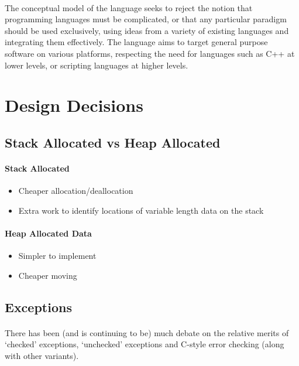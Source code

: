 \documentclass{article}
\begin{document}
\paragraph{}
The conceptual model of the language seeks to reject the notion that programming languages must be complicated, or that any particular paradigm should be used exclusively, using ideas from a variety of existing languages and integrating them effectively. The language aims to target general purpose software on various platforms, respecting the need for languages such as C++ at lower levels, or scripting languages at higher levels.

\section{Design Decisions}

\subsection{Stack Allocated vs Heap Allocated}

\paragraph{Stack Allocated}
\begin{itemize}
\item Cheaper allocation/deallocation
\item Extra work to identify locations of variable length data on the stack
\end{itemize}

\paragraph{Heap Allocated Data}
\begin{itemize}
\item Simpler to implement
\item Cheaper moving
\end{itemize}

\subsection{Exceptions}

\paragraph{}
There has been (and is continuing to be) much debate on the relative merits of `checked' exceptions, `unchecked' exceptions and C-style error checking (along with other variants).
\end{document}
